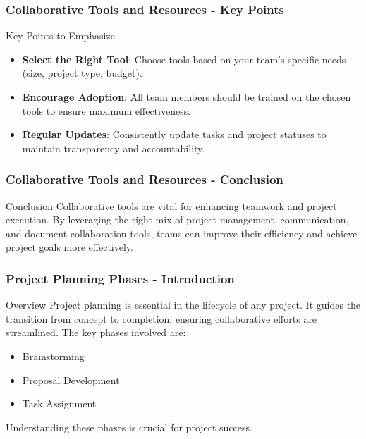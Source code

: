 \documentclass[aspectratio=169]{beamer}
\begin{document}
\begin{frame}[fragile]
    \frametitle{Collaborative Tools and Resources - Key Points}
    \begin{block}{Key Points to Emphasize}
        \begin{itemize}
            \item \textbf{Select the Right Tool}: Choose tools based on your team's specific needs (size, project type, budget).
            \item \textbf{Encourage Adoption}: All team members should be trained on the chosen tools to ensure maximum effectiveness.
            \item \textbf{Regular Updates}: Consistently update tasks and project statuses to maintain transparency and accountability.
        \end{itemize}
    \end{block}
\end{frame}

\begin{frame}[fragile]
    \frametitle{Collaborative Tools and Resources - Conclusion}
    \begin{block}{Conclusion}
    Collaborative tools are vital for enhancing teamwork and project execution. By leveraging the right mix of project management, communication, and document collaboration tools, teams can improve their efficiency and achieve project goals more effectively.
    \end{block}
\end{frame}

\begin{frame}[fragile]
    \frametitle{Project Planning Phases - Introduction}
    \begin{block}{Overview}
        Project planning is essential in the lifecycle of any project. It guides the transition from concept to completion, ensuring collaborative efforts are streamlined. The key phases involved are:
    \end{block}
    \begin{itemize}
        \item Brainstorming
        \item Proposal Development
        \item Task Assignment
    \end{itemize}
    Understanding these phases is crucial for project success.
\end{frame}
\end{document}

